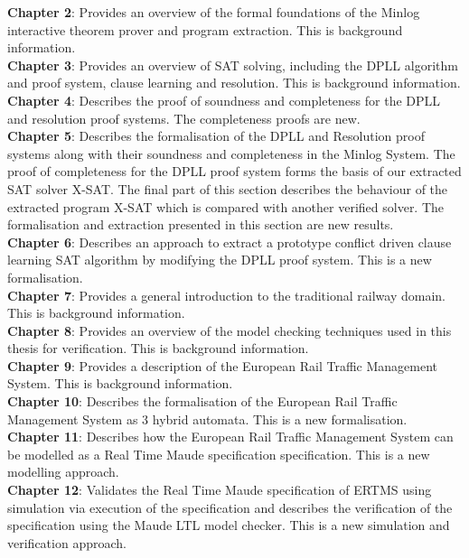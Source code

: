 {%
\textbf{Chapter 2}: Provides an overview of the formal foundations of the Minlog interactive theorem prover and program extraction. This is background information.
\medskip \\
\textbf{Chapter 3}: Provides an overview of SAT solving, including the DPLL algorithm and  proof system, clause learning and resolution. This is background information.
\medskip \\
\textbf{Chapter 4}: Describes the proof of soundness and completeness for the DPLL and resolution proof systems. The completeness proofs are new.
\medskip  \\
\textbf{Chapter 5}: Describes the formalisation of the DPLL and Resolution proof systems along with their soundness and completeness in the Minlog System. The proof of completeness for the DPLL proof system forms the basis of our extracted SAT solver X-SAT. The final part of this section describes the behaviour of the extracted program X-SAT which is compared with another verified solver. The formalisation and extraction presented in this section are new results.
\medskip \\ 
\textbf{Chapter 6}: Describes an approach to extract a prototype conflict driven clause learning SAT algorithm by modifying the DPLL proof system. This is a new formalisation.
\medskip \\
\textbf{Chapter 7}: Provides a general introduction to the traditional railway domain. This is background information.
\medskip \\
\textbf{Chapter 8}: Provides an overview of the model checking techniques used in this thesis for verification. This is background information. \medskip \\
\textbf{Chapter 9}: Provides a description of the European Rail Traffic Management System. This is background information.
\medskip \\
\textbf{Chapter 10}: Describes the formalisation of the European Rail Traffic Management System as 3 hybrid automata. This is a new formalisation.
\medskip \\
\textbf{Chapter 11}: Describes how the European Rail Traffic Management System can be modelled as a Real Time Maude specification  specification. This is a new modelling approach.
\medskip \\
\textbf{Chapter 12}: Validates the Real Time Maude specification of ERTMS using simulation via execution of the specification and describes the verification of the specification using the Maude LTL model checker. This is a new simulation and verification approach.


}
